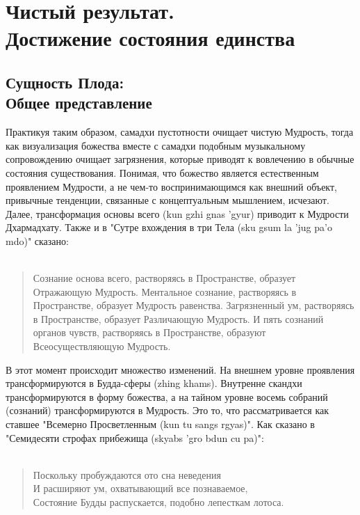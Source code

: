 \section{Чистый результат. \\ Достижение состояния единства}

\subsection{Сущность Плода: \\ Общее представление}

Практикуя таким образом, самадхи пустотности очищает чистую Мудрость, тогда как
визуализация божества вместе с самадхи подобным музыкальному сопровождению очищает
загрязнения, которые приводят к вовлечению в обычные состояния существования. Понимая,
что божество является естественным проявлением Мудрости, а не чем-то
воспринимающимся как внешний объект, привычные тенденции, связанные с
концептуальным мышлением, исчезают. Далее, трансформация основы всего (kun gzhi gnas
'gyur) приводит к Мудрости Дхармадхату. Также и в "Сутре вхождения в три Тела (sku gsum
la 'jug pa'o mdo)" сказано:\\
\\
\begin{verse}
Сознание основа всего, растворяясь в Пространстве, образует Отражающую
Мудрость. Ментальное сознание, растворяясь в Пространстве, образует Мудрость
равенства. Загрязненный ум, растворяясь в Пространстве, образует Различающую
Мудрость. И пять сознаний органов чувств, растворяясь в Пространстве, образуют
Всеосуществляющую Мудрость.
\end{verse}

В этот момент происходит множество изменений. На внешнем уровне проявления
трансформируются в Будда-сферы (zhing khams). Внутренне скандхи трансформируются в
форму божества, а на тайном уровне восемь собраний (сознаний) трансформируются в
Мудрость. Это то, что рассматривается как ставшее "Всемерно Просветленным (kun tu sangs
rgyas)". Как сказано в "Семидесяти строфах прибежища (skyabs 'gro bdun cu pa)":\\
\\
\begin{verse}
Поскольку пробуждаются ото сна неведения\\
И расширяют ум, охватывающий все познаваемое,\\
Состояние Будды распускается, подобно лепесткам лотоса.
\end{verse}

